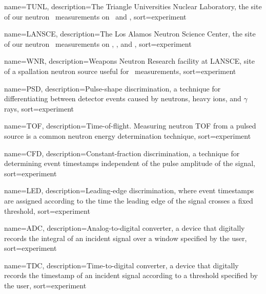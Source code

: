 {
    name={TUNL},
    description={The Triangle Universities Nuclear Laboratory, the site of our neutron \el\ 
        measurements on \snTwelve\ and \snFour},
    sort={experiment}
}

{
    name={LANSCE},
    description={The Los Alamos Neutron Science Center, the site of our neutron \tot\ measurements on
    \oSixEight, \niEightFour, and \snTwelveFour},
    sort={experiment}
}

{
    name={WNR},
    description={Weapons Neutron Research facility at LANSCE, site of a spallation neutron source
    useful for \tot\ measurements},
    sort={experiment}
}

{
    name={PSD},
    description={Pulse-shape discrimination, a technique for differentiating between detector events
    caused by neutrons, heavy ions, and $\gamma$ rays},
    sort={experiment}
}

{
    name={TOF},
    description={Time-of-flight. Measuring neutron TOF from a pulsed source is a common
    neutron energy determination technique},
    sort={experiment}
}

{
    name={CFD},
    description={Constant-fraction discrimination, a technique for determining event timestamps
    independent of the pulse amplitude of the signal},
    sort={experiment}
}

{
    name={LED},
    description={Leading-edge discrimination, where event timestamps are assigned according to the
    time the leading edge of the signal crosses a fixed threshold},
    sort={experiment}
}

{
    name={ADC},
    description={Analog-to-digital converter, a device that digitally records the integral of an 
    incident signal over a window specified by the user},
    sort={experiment}
}

{
    name={TDC},
    description={Time-to-digital converter, a device that digitally records the timestamp of an
    incident signal according to a threshold specified by the user},
    sort={experiment}
}

